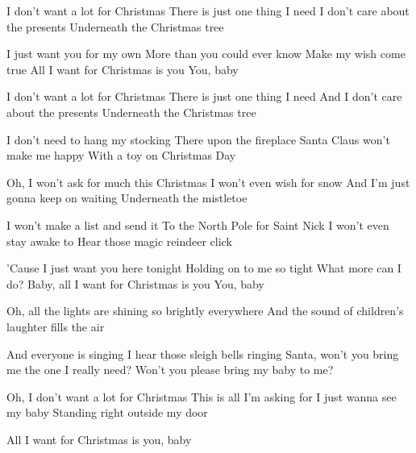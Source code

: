 \begin{verse*}
I don't want a lot for Christmas
There is just one thing I need
I don't care about the presents
Underneath the Christmas tree
\end{verse*}

\begin{chorus}
I just want you for my own
More than you could ever know
Make my wish come true
All I want for Christmas is you
You, baby
\end{chorus}

\begin{verse*}
I don't want a lot for Christmas
There is just one thing I need
And I don't care about the presents
Underneath the Christmas tree
\end{verse*}

\begin{verse*}
I don't need to hang my stocking
There upon the fireplace
Santa Claus won't make me happy
With a toy on Christmas Day
\end{verse*}

\thechorus

\begin{verse*}
Oh, I won't ask for much this Christmas
I won't even wish for snow
And I'm just gonna keep on waiting
Underneath the mistletoe
\end{verse*}

\begin{verse*}
I won't make a list and send it
To the North Pole for Saint Nick
I won't even stay awake to
Hear those magic reindeer click
\end{verse*}

\begin{verse*}
'Cause I just want you here tonight
Holding on to me so tight
What more can I do?
Baby, all I want for Christmas is you
You, baby
\end{verse*}

\begin{bridge}
Oh, all the lights are shining so brightly everywhere
And the sound of children's laughter fills the air

And everyone is singing
I hear those sleigh bells ringing
Santa, won't you bring me the one I really need?
Won't you please bring my baby to me?
\end{bridge}

\begin{verse*}
Oh, I don't want a lot for Christmas
This is all I'm asking for
I just wanna see my baby
Standing right outside my door
\end{verse*}

\thechorus

All I want for Christmas is you, baby 